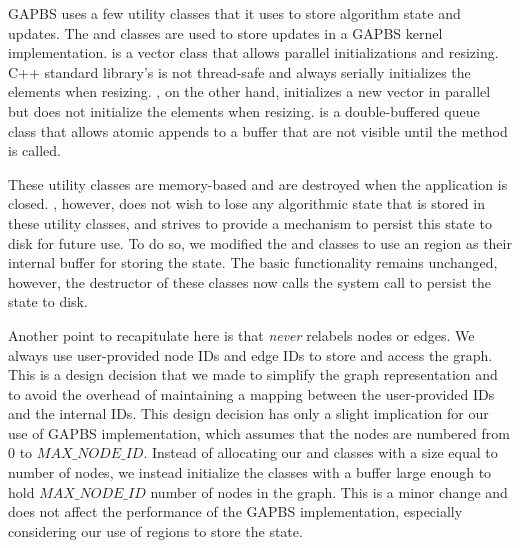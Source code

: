 GAPBS uses a few utility classes that it uses to store algorithm state and updates.
The  and  classes are used to store updates in a GAPBS kernel implementation. 
 is a vector class that allows parallel initializations and resizing. C++ standard library's  is not thread-safe and always serially initializes the elements when resizing. , on the other hand, initializes a new vector in parallel but does not initialize the elements when resizing.
 is a double-buffered queue class that allows atomic appends to a buffer that are not visible until the  method is called.

These utility classes are memory-based and are destroyed when the application is closed.
\project{}, however,  does not wish to lose any algorithmic state that is stored in these utility classes, and strives to provide a mechanism to persist this state to disk for future use.
To do so, we modified the  and  classes to use an  region as their internal buffer for storing the state.
The basic functionality remains unchanged, however, the destructor of these classes now calls the  system call to persist the state to disk.

Another point to recapitulate here is that \project{} \emph{never} relabels nodes or edges.
We always use user-provided node IDs and edge IDs to store and access the graph.
This is a design decision that we made to simplify the graph representation and to avoid the overhead of maintaining a mapping between the user-provided IDs and the internal IDs.
This design decision has only a slight implication for our use of GAPBS implementation, which assumes that the nodes are numbered from 0 to $MAX\_NODE\_ID$.
Instead of allocating our  and  classes with a size equal to number of nodes, we instead initialize the classes with a buffer large enough to hold $MAX\_NODE\_ID$ number of nodes in the graph.
This is a minor change and does not affect the performance of the GAPBS implementation, especially considering our use of  regions to store the state.